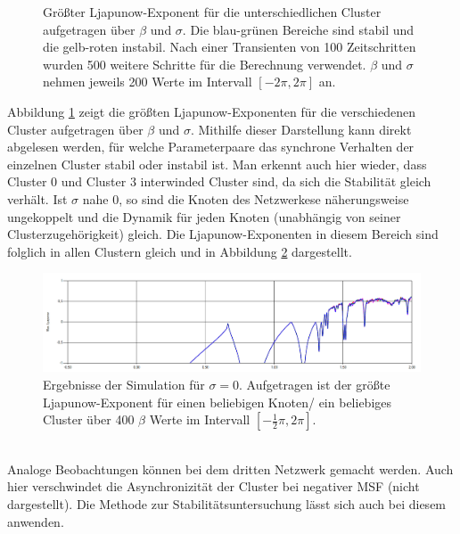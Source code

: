 \begin{figure}[h]
{	}
	\caption{Größter Ljapunow-Exponent für die unterschiedlichen Cluster aufgetragen über $\beta$ und $\sigma$. Die blau-grünen Bereiche sind stabil und die gelb-roten instabil. Nach einer Transienten von 100 Zeitschritten wurden 500 weitere Schritte für die Berechnung verwendet. $\beta$ und $\sigma$ nehmen jeweils 200 Werte im Intervall $[-2\pi,2\pi]$ an.}
	\label{fig:2dplots}	
\end{figure}
Abbildung \ref{fig:2dplots} zeigt die größten Ljapunow-Exponenten für die verschiedenen Cluster aufgetragen über $\beta$ und $\sigma$. Mithilfe dieser Darstellung kann direkt abgelesen werden, für welche Parameterpaare das synchrone Verhalten der einzelnen Cluster stabil oder instabil ist. Man erkennt auch hier wieder, dass Cluster 0 und Cluster 3 interwinded Cluster sind, da sich die Stabilität gleich verhält. Ist $\sigma$ nahe 0, so sind die Knoten des Netzwerkese näherungsweise ungekoppelt und die Dynamik für jeden Knoten (unabhängig von seiner Clusterzugehörigkeit) gleich. Die Ljapunow-Exponenten in diesem Bereich sind folglich in allen Clustern gleich und in Abbildung \ref{fig:sigma0} dargestellt. 
\begin{figure}
	\centering
	\includegraphics[width=1.0\textwidth]{abb/misc/sigma0.png}
	\caption{Ergebnisse der Simulation für $\sigma=0$. Aufgetragen ist der größte Ljapunow-Exponent für einen beliebigen Knoten/ ein beliebiges Cluster über 400 $\beta$ Werte im Intervall $[-\frac{1}{2}\pi,2\pi]$.}
	\label{fig:sigma0}
\end{figure}\\
Analoge Beobachtungen können bei dem dritten Netzwerk gemacht werden. Auch hier verschwindet die Asynchronizität der Cluster bei negativer MSF (nicht dargestellt). Die Methode zur Stabilitätsuntersuchung lässt sich auch bei diesem anwenden.